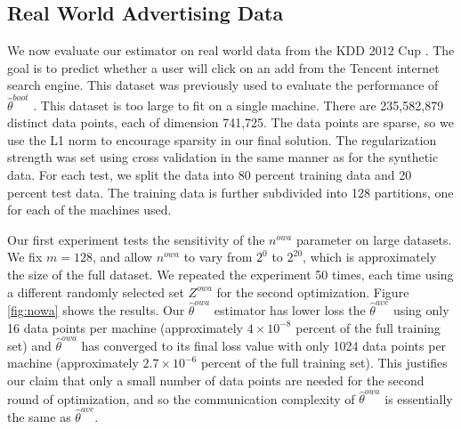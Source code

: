\documentclass[twoside]{article}
\newcommand{\Zowa}{Z^{\textit{owa}}}
\newcommand{\nowa}{n^{\textit{owa}}}
\newcommand{\w}{\theta}
\newcommand{\wowa}{\hat\w^{owa}}
\newcommand{\wave}{\hat\w^{ave}}
\newcommand{\wboot}{\hat\w^{boot}}
\begin{document}
\subsection{Real World Advertising Data}

We now evaluate our estimator on real world data from the KDD 2012 Cup \citep{kddcup2012}.
The goal is to predict whether a user will click on an add from the Tencent internet search engine.
This dataset was previously used to evaluate the performance of $\wboot$ \citep{zhang2012communication}.
This dataset is too large to fit on a single machine.
There are 235,582,879 distinct data points,
each of dimension 741,725.
The data points are sparse, so we use the L1 norm to encourage sparsity in our final solution.
The regularization strength was set using cross validation in the same manner as for the synthetic data.
For each test, we split the data into 80 percent training data and 20 percent test data.
The training data is further subdivided into 128 partitions,
one for each of the machines used.

Our first experiment tests the sensitivity of the $\nowa$ parameter on large datasets.
We fix $m=128$, and allow $\nowa$ to vary from $2^0$ to $2^{20}$,
which is approximately the size of the full dataset.
We repeated the experiment 50 times, each time using a different randomly selected set $\Zowa$ for the second optimization.
Figure \ref{fig:nowa} shows the results.
Our $\wowa$ estimator has lower loss the $\wave$ using only 16 data points per machine (approximately $4\times10^{-8}$ percent of the full training set)
and $\wowa$ has converged to its final loss value with only 1024 data points per machine (approximately $2.7\times10^{-6}$ percent of the full training set).
This justifies our claim that only a small number of data points are needed for the second round of optimization,
and so the communication complexity of $\wowa$ is essentially the same as $\wave$.
\end{document}

